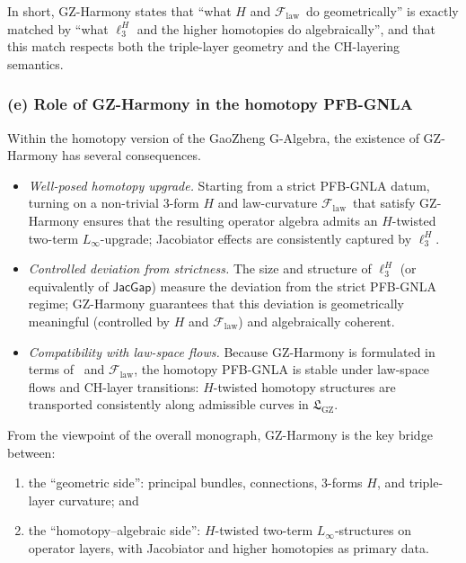 \documentclass[11pt]{book}
\theoremstyle{plain}
\theoremstyle{definition}
\newcommand{\GZLS}{\ensuremath{\mathfrak{L}_{\mathrm{GZ}}}}       \newcommand{\GZLT}{\ensuremath{M_{!w}}}                           \newcommand{\GZLOC}{\ensuremath{A_M}}                             \newcommand{\GZLCurv}{\ensuremath{\mathcal{F}_{\mathrm{law}}}}
\begin{document}
In short, GZ-Harmony states that “what $H$ and \GZLCurv\ do
geometrically” is exactly matched by “what $\ell_3^H$ and the higher
homotopies do algebraically”, and that this match respects both the
triple-layer geometry and the CH-layering semantics.



\subsubsection*{(e) Role of GZ-Harmony in the homotopy PFB-GNLA}

Within the homotopy version of the GaoZheng G-Algebra, the existence
of GZ-Harmony has several consequences.

\begin{itemize}
  \item \emph{Well-posed homotopy upgrade.}
        Starting from a strict PFB-GNLA datum, turning on a non-trivial
        3-form $H$ and law-curvature \GZLCurv\ that satisfy
        GZ-Harmony ensures that the resulting operator algebra admits
        an $H$-twisted two-term $L_\infty$-upgrade; Jacobiator effects
        are consistently captured by $\ell_3^H$.
  \item \emph{Controlled deviation from strictness.}
        The size and structure of $\ell_3^H$ (or equivalently of
        $\mathsf{JacGap}$) measure the deviation from the strict
        PFB-GNLA regime; GZ-Harmony guarantees that this deviation is
        geometrically meaningful (controlled by $H$ and \GZLCurv) and
        algebraically coherent.
  \item \emph{Compatibility with law-space flows.}
        Because GZ-Harmony is formulated in terms of \GZTLC\ and
        \GZLCurv, the homotopy PFB-GNLA is stable under law-space flows
        and CH-layer transitions: $H$-twisted homotopy structures are
        transported consistently along admissible curves in \GZLS.
\end{itemize}

From the viewpoint of the overall monograph, GZ-Harmony is the key
bridge between:

\begin{enumerate}[label=\alph*)]
  \item the “geometric side”: principal bundles, connections, 3-forms
        $H$, and triple-layer curvature; and
  \item the “homotopy–algebraic side”: $H$-twisted two-term
        $L_\infty$-structures on operator layers, with Jacobiator and
        higher homotopies as primary data.
\end{enumerate}
\end{document}
